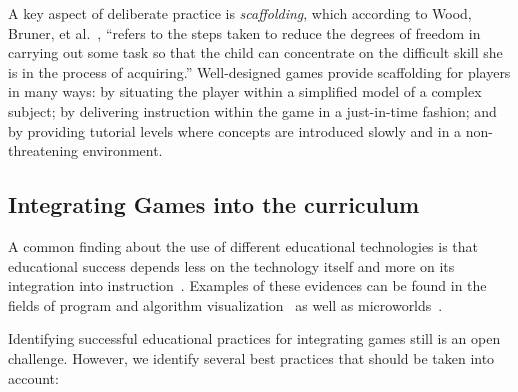 \documentclass{sig-alternate-05-2015}
\begin{document}
A key aspect of deliberate practice is {\em scaffolding}, which according to Wood, Bruner, et al.~\cite{wood1976role}, ``refers to the steps taken to reduce the degrees of freedom in carrying out some task so that the child can concentrate on the difficult skill she is in the process of acquiring.'' Well-designed games provide scaffolding for players in many ways: by situating the player within a simplified model of a complex subject; by delivering instruction within the game in a just-in-time fashion; and by providing tutorial levels where concepts are introduced slowly and in a non-threatening environment.\subsection{Integrating Games into the curriculum}


\label{section:integrating}



A common finding about the use of different educational technologies is that educational success depends less on the technology itself and more on its integration into instruction~\cite{oneil05classification}. Examples of these evidences can be found in the fields of program and algorithm visualization~\cite{hundhausen02metastudy,naps03exploring} as well as microworlds~\cite{miller99goals}.



Identifying successful educational practices for integrating games still is an open challenge. However, we identify several best practices that should be taken into account:
\end{document}
